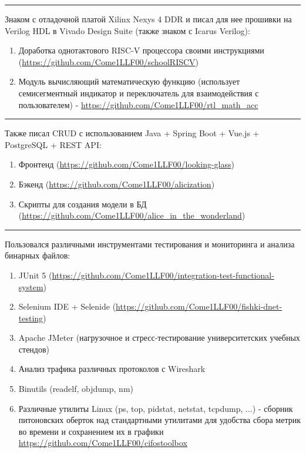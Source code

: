 \documentclass[10pt, final, twoside]{article}
\begin{document}
\par\noindent\rule{\textwidth}{0.1pt}

Знаком с отладочной платой Xilinx Nexys 4 DDR и писал для нее прошивки на Verilog HDL в Vivado Design Suite (также знаком с Icarus Verilog):
\begin{enumerate}
  \item Доработка однотактового RISC-V процессора своими инструкциями (\url{https://github.com/Come1LLF00/schoolRISCV})
  \item Модуль вычисляющий математическую функцию (использует семисегментный индикатор и переключатель для взаимодействия с пользователем) - \url{https://github.com/Come1LLF00/rtl_math_acc}
\end{enumerate}

\par\noindent\rule{\textwidth}{0.1pt}

Также писал CRUD с использованием Java + Spring Boot + Vue.js + PostgreSQL + REST API:
\begin{enumerate}
  \item Фронтенд (\url{https://github.com/Come1LLF00/looking-glass})
  \item Бэкенд (\url{https://github.com/Come1LLF00/alicization})
  \item Скрипты для создания модели в БД (\url{https://github.com/Come1LLF00/alice_in_the_wonderland})
\end{enumerate}

\par\noindent\rule{\textwidth}{0.1pt}

Пользовался различными инструментами тестирования и мониторинга и анализа бинарных файлов:
\begin{enumerate}
  \item JUnit 5 (\url{https://github.com/Come1LLF00/integration-test-functional-system})
  \item Selenium IDE + Selenide (\url{https://github.com/Come1LLF00/fishki-dnet-testing})
  \item Apache JMeter (нагрузочное и стресс-тестирование университетских учебных стендов)
  \item Анализ трафика различных протоколов с Wireshark
  \item Binutils (readelf, objdump, nm)
  \item Различные утилиты Linux (ps, top, pidstat, netstat, tcpdump, ...) - сборник питоновских оберток над стандартными утилитами для удобства сбора метрик во времени и сохранением их в графики \url{https://github.com/Come1LLF00/cifostoolbox}
\end{enumerate}
\end{document}
